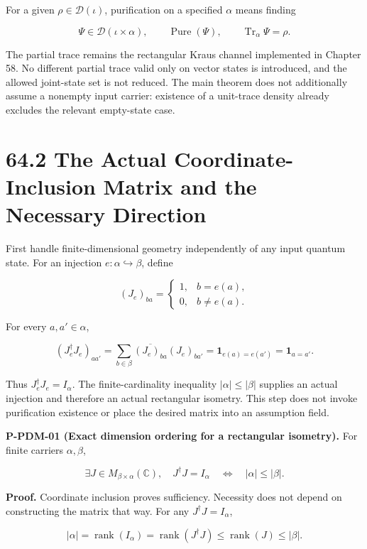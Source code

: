 \documentclass[
  11pt,
  oneside]{book}
\begin{document}
For a given \(\rho\in\mathcal D(\iota)\), purification on a specified
\(\alpha\) means finding

\[
\Psi\in\mathcal D(\iota\times\alpha),\qquad
\operatorname{Pure}(\Psi),\qquad
\operatorname{Tr}_\alpha\Psi=\rho.
\]

The partial trace remains the rectangular Kraus channel implemented in
Chapter 58. No different partial trace valid only on vector states is
introduced, and the allowed joint-state set is not reduced. The main
theorem does not additionally assume a nonempty input carrier: existence
of a unit-trace density already excludes the relevant empty-state case.

\section{64.2 The Actual Coordinate-Inclusion Matrix and the Necessary
Direction}

First handle finite-dimensional geometry independently of any input
quantum state. For an injection \(e:\alpha\hookrightarrow\beta\), define

\[
(J_e)_{ba}=\begin{cases}1,&b=e(a),\\0,&b\ne e(a).\end{cases}
\]

For every \(a,a'\in\alpha\),

\[
(J_e^\dagger J_e)_{aa'}
=\sum_{b\in\beta}\overline{(J_e)_{ba}}(J_e)_{ba'}
=\mathbf1_{e(a)=e(a')}=\mathbf1_{a=a'}.
\]

Thus \(J_e^\dagger J_e=I_\alpha\). The finite-cardinality inequality
\(|\alpha|\le|\beta|\) supplies an actual injection and therefore an
actual rectangular isometry. This step does not invoke purification
existence or place the desired matrix into an assumption field.

\label{p-pdm-01}{}

\textbf{P-PDM-01 (Exact dimension ordering for a rectangular isometry).}
For finite carriers \(\alpha,\beta\),

\[
\exists J\in M_{\beta\times\alpha}(\mathbb C),\quad J^\dagger J=I_\alpha
\quad\Longleftrightarrow\quad |\alpha|\le|\beta|.
\]

\textbf{Proof.} Coordinate inclusion proves sufficiency. Necessity does
not depend on constructing the matrix that way. For any
\(J^\dagger J=I_\alpha\),

\[
|\alpha|=\operatorname{rank}(I_\alpha)
=\operatorname{rank}(J^\dagger J)
\le\operatorname{rank}(J)\le|\beta|.
\]
\end{document}
